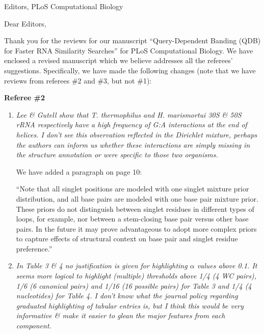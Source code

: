 \documentclass{jfrcletter}
\begin{document}
\signature{Sean R. Eddy, Ph.D.}

%
\begin{letter}{Editors, PLoS Computational Biology}

%
\opening{Dear Editors,}

Thank you for the reviews for our manuscript ``Query-Dependent Banding
(QDB) for Faster RNA Similarity Searches'' for PLoS Computational
Biology. We have enclosed a revised manuscript which we believe
addresses all the referees' suggestions. Specifically, we have made
the following changes (note that we have reviews from referees \#2 and
\#3, but not \#1):

\textbf{Referee \#2}

\begin{enumerate}
\item  \emph{\footnotesize Lee \& Gutell show that T. thermophilus and H. marismortui 30S \& 50S
   rRNA respectively have a high frequency of G:A interactions at the end
   of helices. I don't see this observation reflected in the Dirichlet
   mixture, perhaps the authors can inform us whether these interactions
   are simply missing in the structure annotation or were specific to
   those two organisms.}

   We have added a paragraph on page 10:

   ``Note that all singlet positions are modeled with one singlet
   mixture prior distribution, and all base pairs are modeled with one
   base pair mixture prior. These priors do not distinguish between
   singlet residues in different types of loops, for example, nor
   between a stem-closing base pair versus other base pairs. In the
   future it may prove advantageous to adopt more complex priors to
   capture effects of structural context on base pair and
   singlet residue preference.''

\item \emph{\footnotesize In Table 3 \& 4 no justification is given for highlighting
   $\alpha$ values above 0.1. It seems more logical to highlight
   (multiple) thresholds above 1/4 (4 WC pairs), 1/6 (6 canonical
   pairs) and 1/16 (16 possible pairs) for Table 3 and 1/4 (4
   nucleotides) for Table 4. I don't know what the journal policy
   regarding graduated highlighting of tabular entries is, but I
   think this would be very informative \& make it easier to glean the
   major features from each component.}


\end{enumerate}
\end{letter}
\end{document}
